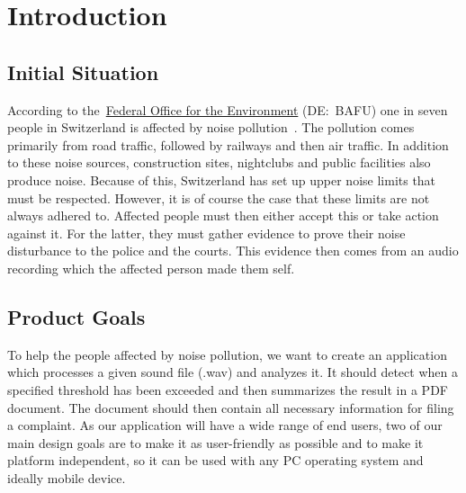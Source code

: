 \section{Introduction}\label{sec:introduction}

\subsection{Initial Situation}\label{subsec:initial-situation}
According to the~\href{https://www.bafu.admin.ch//}{Federal Office for the Environment} (DE:\ BAFU) one in seven people in Switzerland is affected by noise pollution~\cite{foen_noise_pollution}.
The pollution comes primarily from road traffic, followed by railways and then air traffic.
In addition to these noise sources, construction sites, nightclubs and public facilities also produce noise.
Because of this, Switzerland has set up upper noise limits that must be respected.
However, it is of course the case that these limits are not always adhered to.
Affected people must then either accept this or take action against it.
For the latter, they must gather evidence to prove their noise disturbance to the police and the courts.
This evidence then comes from an audio recording which the affected person made them self.

\subsection{Product Goals}\label{subsec:product-goals}
To help the people affected by noise pollution, we want to create an application which processes a given sound file (.wav)
and analyzes it.
It should detect when a specified threshold has been exceeded and then summarizes the result in a PDF document.
The document should then contain all necessary information for filing a complaint.
As our application will have a wide range of end users, two of our main design goals are to make it as user-friendly as possible
and to make it platform independent, so it can be used with any PC operating system and ideally mobile device.

